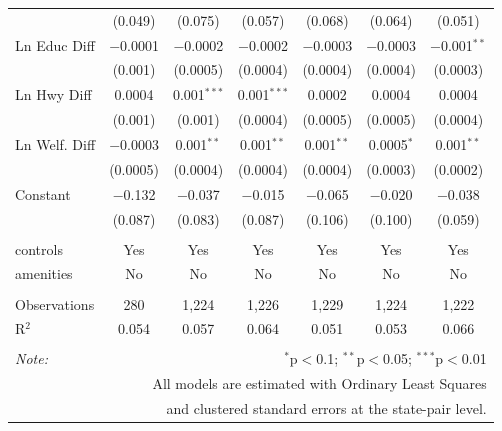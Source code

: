 \begin{table}[!htbp]
\begin{tabular}{@{\extracolsep{5pt}}lcccccc}
  & (0.049) & (0.075) & (0.057) & (0.068) & (0.064) & (0.051) \\ 
  Ln Educ Diff & $-$0.0001 & $-$0.0002 & $-$0.0002 & $-$0.0003 & $-$0.0003 & $-$0.001$^{**}$ \\ 
  & (0.001) & (0.0005) & (0.0004) & (0.0004) & (0.0004) & (0.0003) \\ 
  Ln Hwy Diff & 0.0004 & 0.001$^{***}$ & 0.001$^{***}$ & 0.0002 & 0.0004 & 0.0004 \\ 
  & (0.001) & (0.001) & (0.0004) & (0.0005) & (0.0005) & (0.0004) \\ 
  Ln Welf. Diff & $-$0.0003 & 0.001$^{**}$ & 0.001$^{**}$ & 0.001$^{**}$ & 0.0005$^{*}$ & 0.001$^{**}$ \\ 
  & (0.0005) & (0.0004) & (0.0004) & (0.0004) & (0.0003) & (0.0002) \\ 
  Constant & $-$0.132 & $-$0.037 & $-$0.015 & $-$0.065 & $-$0.020 & $-$0.038 \\ 
  & (0.087) & (0.083) & (0.087) & (0.106) & (0.100) & (0.059) \\ 
 \hline \\[-1.8ex] 
controls & Yes & Yes & Yes & Yes & Yes & Yes \\ 
amenities & No & No & No & No & No & No \\ 
\hline \\[-1.8ex] 
Observations & 280 & 1,224 & 1,226 & 1,229 & 1,224 & 1,222 \\ 
R$^{2}$ & 0.054 & 0.057 & 0.064 & 0.051 & 0.053 & 0.066 \\ 
\hline 
\hline \\[-1.8ex] 
\textit{Note:}  & \multicolumn{6}{r}{$^{*}$p$<$0.1; $^{**}$p$<$0.05; $^{***}$p$<$0.01} \\ 
 & \multicolumn{6}{r}{All models are estimated with Ordinary Least Squares} \\ 
 & \multicolumn{6}{r}{and clustered standard errors at the state-pair level.} \\ 
\end{tabular} 
\end{table} 

